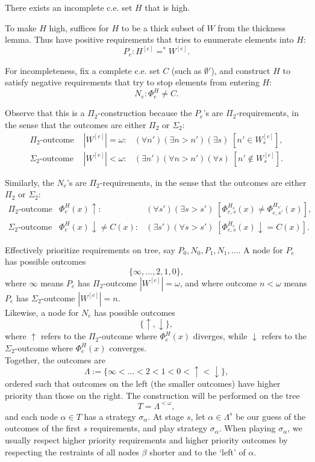 \begin{theorem}
  There exists an incomplete c.e. set $H$ that is high.
\end{theorem}

To make $H$ high, suffices for $H$ to be a thick subset of $W$ from the
thickness lemma. Thus have positive requirements that tries to enumerate
elements into $H$:
\[P_e: H^{[e]} =^* W^{[e]}.\]

For incompleteness, fix a complete c.e. set $C$ (such as $\emptyset'$),
and construct $H$ to satisfy negative requirements that try to stop
elements from entering $H$:
\[N_e: \Phi_e^H \neq C.\]

Observe that this is a $\Pi_2$-construction because the $P_e$'s are
$\Pi_2$-requirements, in the sense that the outcomes are either $\Pi_2$
or $\Sigma_2$:
\begin{align*}
  \Pi_2\text{-outcome } &|W^{[e]}|=\omega: &(\forall n')(\exists
    n>n')(\exists s)\; [n'\in W^{[e]}_s],\\
  \Sigma_2\text{-outcome } &|W^{[e]}|<\omega: &(\exists n')(\forall
    n>n')(\forall s)\; [n'\not\in W^{[e]}_s].
\end{align*}

Similarly, the $N_e$'s are $\Pi_2$-requirements, in the sense that the
outcomes are either $\Pi_2$ or $\Sigma_2$:
\begin{align*}
  \Pi_2\text{-outcome } &\Phi_e^H(x)\uparrow: &(\forall s')(\exists
    s>s')\; [\Phi^{H_s}_{e,s}(x) \neq \Phi^{H_{s'}}_{e,s'}(x)],\\
  \Sigma_2\text{-outcome } &\Phi_e^H(x)\downarrow \neq C(x): &(\exists
    s')(\forall s>s')\; [\Phi^{H_s}_{e,s}(x) \downarrow=C(x)].
\end{align*}

Effectively prioritize requirements on tree, say
$P_0,N_0,P_1,N_1,\ldots$. A node for $P_e$ has possible outcomes
\[\{\infty, \ldots, 2, 1, 0\},\]
where $\infty$ means $P_e$ has $\Pi_2$-outcome $|W^{[e]}|=\omega$, and
where outcome $n<\omega$ means $P_e$ has $\Sigma_2$-outcome
$|W^{[e]}|=n$.\\

Likewise, a node for $N_e$ has possible outcomes
\[\{\uparrow, \downarrow\},\]
where $\uparrow$ refers to the $\Pi_2$-outcome where $\Phi_e^H(x)$
diverges, while $\downarrow$ refers to the $\Sigma_2$-outcome where
$\Phi_e^H(x)$ converges.\\

Together, the outcomes are
\[\Lambda :=\{\infty <\ldots <2<1<0 <\uparrow <\downarrow\},\]
ordered such that outcomes on the left (the smaller outcomes) have higher
priority than those on the right. The construction will be performed on
the tree
\[T =\Lambda^{<\omega},\]
and each node $\alpha\in T$ has a strategy $\sigma_\alpha$. At stage $s$,
let $\alpha\in \Lambda^s$ be our guess of the outcomes of the first
$s$ requirements, and play strategy $\sigma_\alpha$. When playing
$\sigma_\alpha$, we usually respect higher priority requirements and
higher priority outcomes by respecting the restraints of all nodes
$\beta$ shorter and to the `left' of $\alpha$.\\

